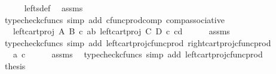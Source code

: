 \begin{isabellebody}
\ \ \ \ \isamarkupfalse%
\ lefts{\isacharunderscore}{\kern0pt}def\ \isamarkupfalse%
\ assms\ \isamarkupfalse%
\ {\isacharparenleft}{\kern0pt}typecheck{\isacharunderscore}{\kern0pt}cfuncs{\isacharcomma}{\kern0pt}\ simp\ add{\isacharcolon}{\kern0pt}\ cfunc{\isacharunderscore}{\kern0pt}prod{\isacharunderscore}{\kern0pt}comp\ comp{\isacharunderscore}{\kern0pt}associative{}{\isacharparenright}{\kern0pt}\isanewline
\ \ \isamarkupfalse%
\ \isamarkupfalse%
\ {\isachardoublequoteopen}{\isachardot}{\kern0pt}{\isachardot}{\kern0pt}{\isachardot}{\kern0pt}\ {\isacharequal}{\kern0pt}\ {\isasymlangle}left{\isacharunderscore}{\kern0pt}cart{\isacharunderscore}{\kern0pt}proj\ A\ B\ {\isasymcirc}\isactrlsub c\ {\isasymlangle}a{\isacharcomma}{\kern0pt}b{\isasymrangle}{\isacharcomma}{\kern0pt}\ left{\isacharunderscore}{\kern0pt}cart{\isacharunderscore}{\kern0pt}proj\ C\ D\ {\isasymcirc}\isactrlsub c\ {\isasymlangle}c{\isacharcomma}{\kern0pt}d{\isasymrangle}{\isasymrangle}{\isachardoublequoteclose}\isanewline
\ \ \ \ \isamarkupfalse%
\ assms\ \isamarkupfalse%
\ {\isacharparenleft}{\kern0pt}typecheck{\isacharunderscore}{\kern0pt}cfuncs{\isacharcomma}{\kern0pt}\ simp\ add{\isacharcolon}{\kern0pt}\ left{\isacharunderscore}{\kern0pt}cart{\isacharunderscore}{\kern0pt}proj{\isacharunderscore}{\kern0pt}cfunc{\isacharunderscore}{\kern0pt}prod\ right{\isacharunderscore}{\kern0pt}cart{\isacharunderscore}{\kern0pt}proj{\isacharunderscore}{\kern0pt}cfunc{\isacharunderscore}{\kern0pt}prod{\isacharparenright}{\kern0pt}\isanewline
\ \ \isamarkupfalse%
\ \isamarkupfalse%
\ {\isachardoublequoteopen}{\isachardot}{\kern0pt}{\isachardot}{\kern0pt}{\isachardot}{\kern0pt}\ {\isacharequal}{\kern0pt}\ {\isasymlangle}a{\isacharcomma}{\kern0pt}\ c{\isasymrangle}{\isachardoublequoteclose}\isanewline
\ \ \ \ \isamarkupfalse%
\ assms\ \isamarkupfalse%
\ {\isacharparenleft}{\kern0pt}typecheck{\isacharunderscore}{\kern0pt}cfuncs{\isacharcomma}{\kern0pt}\ simp\ add{\isacharcolon}{\kern0pt}\ left{\isacharunderscore}{\kern0pt}cart{\isacharunderscore}{\kern0pt}proj{\isacharunderscore}{\kern0pt}cfunc{\isacharunderscore}{\kern0pt}prod{\isacharparenright}{\kern0pt}\isanewline
\ \ \isamarkupfalse%
\ \isamarkupfalse%
\ {\isacharquery}{\kern0pt}thesis\isacommand{{\isachardot}{\kern0pt}}\isamarkupfalse%
\isanewline
{}\isamarkupfalse%
%
\endisatagproof
{\isafoldproof}%
%

\end{isabellebody}
